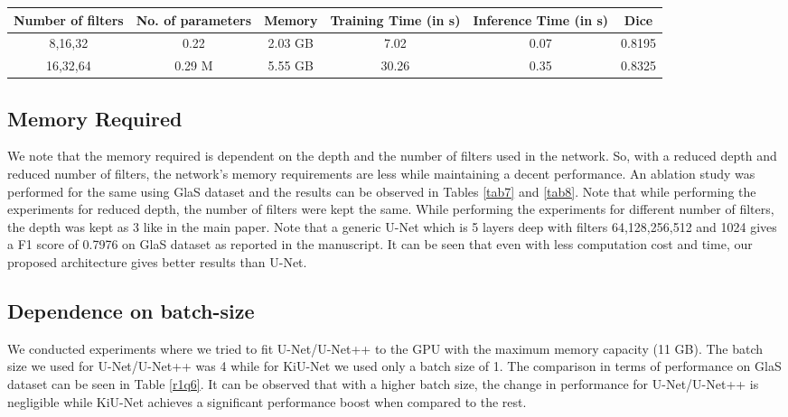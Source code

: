 \documentclass[journal,twoside,web]{ieeecolor}
\begin{document}
\begin{table*}[htbp]
	\centering
	\caption{Comparison of performance when training KiU-Net with different number of filters using the GlaS dataset.}
	\begin{tabular}{c|c|c|c|c|c}
		\hline
		Number of filters                   & No. of parameters  & Memory                & Training Time (in s)        & Inference Time (in s) & Dice \\ \hline
		8,16,32                       & 0.22                 & 2.03 GB                 & 7.02                  & 0.07               &  0.8195         \\ \hline
		16,32,64 & 0.29 M & 5.55 GB   & 30.26  & 0.35                & 0.8325        
	\end{tabular}
	
	\label{tab8}
\end{table*}

\subsection{Memory Required}
We note that the memory required is dependent on the
depth and the number of filters used in the network. So, with a reduced depth and reduced number
of filters, the network’s memory requirements are less while maintaining a decent performance. An
ablation study was performed for the same using GlaS dataset and the results can be observed
in Tables \ref{tab7} and \ref{tab8}. Note that while performing the experiments for reduced depth, the number
of filters were kept the same. While performing the experiments for
different number of filters, the depth was kept as 3 like in the main paper. Note that a generic
U-Net which is 5 layers deep with filters 64,128,256,512 and 1024 gives a F1 score of 0.7976 on
GlaS dataset as reported in the manuscript. It can be seen that even with less computation cost and time, our proposed architecture gives better results than U-Net.

\subsection{Dependence on batch-size}
We conducted experiments where we tried to fit U-Net/U-Net++ to the GPU with the maximum memory capacity (11 GB). The batch size we used for U-Net/U-Net++ was 4 while for KiU-Net we used only a batch size of 1. The comparison in terms of performance on GlaS dataset can be seen in Table \ref{r1q6}. It can be observed that with a higher batch size, the change in performance for U-Net/U-Net++ is negligible while KiU-Net achieves a significant performance boost when compared to the rest. 
\end{document}
